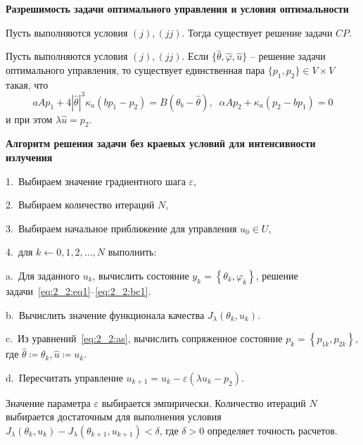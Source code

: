 \begin{frame}
    \textbf{Разрешимость задачи оптимального управления и условия оптимальности}

    \begin{theorem}[2.3]
        \label{th:2_2:1}
        Пусть выполняются условия $(j), (jj)$.
        Тогда существует решение задачи $CP$.
    \end{theorem}
    \begin{theorem}[2.4]
        \label{th:2_2:2}
        Пусть выполняются условия $(j),(jj)$.
        Если $\{\hat{\theta}, \hat{\varphi}, \hat{u}\}$ -- решение задачи оптимального управления,
        то существует единственная пара $\{p_1, p_2 \} \in V\times V$ такая, что
        \begin{equation}
            \label{eq:2_2:as}
            aAp_1 +4|\hat{\theta}|^3 \kappa_a(bp_1 - p_2) = B(\theta_b - \hat{\theta}), \;\;
            \alpha A p_2 + \kappa_a (p_2 - b p_1)=0
        \end{equation}
        и при этом $\lambda\hat{u} = p_2$.
    \end{theorem}


    \textbf{Алгоритм решения задачи без краевых условий для интенсивности излучения}

    1.\ Выбираем значение градиентного шага $\varepsilon$,

    2.\ Выбираем количество итераций $N$,

    3.\ Выбираем начальное приближение для управления $u_{0} \in U$,

    4.\ для $k \leftarrow 0,1,2, \ldots, N$ выполнить:

    \hspace{1cm} a.\ Для заданного $u_{k}$, вычислить состояние
    $y_{k}=\left\{\theta_{k}, \varphi_{k}\right\}$, решение
    задачи~\eqref{eq:2_2:eq1}--\eqref{eq:2_2:bc1}.

    \hspace{1cm} b.\ Вычислить значение функционала качества
    $J_{\lambda}\left(\theta_{k}, u_{k}\right)$.

    \hspace{1cm} c.\ Из уравнений~\eqref{eq:2_2:as}, вычислить сопряженное
    состояние $p_{k}=\left\{p_{1k}, p_{2k}\right\}$,
    где $\widehat{\theta} \coloneqq \theta_{k}, \widehat{u} \coloneqq u_{k}$.

    \hspace{1cm} d.\ Пересчитать управление
    $u_{k+1}=u_{k}-\varepsilon\left(\lambda u_{k}-p_{2}\right)$.


    Значение параметра $\varepsilon$ выбирается эмпирически.
    Количество итераций $N$ выбирается достаточным для выполнения условия
    $J_\lambda(\theta_k, u_k) - J_\lambda(\theta_{k+1}, u_{k+1}) < \delta$, где $\delta>0$
    определяет точность расчетов.
\end{frame}
